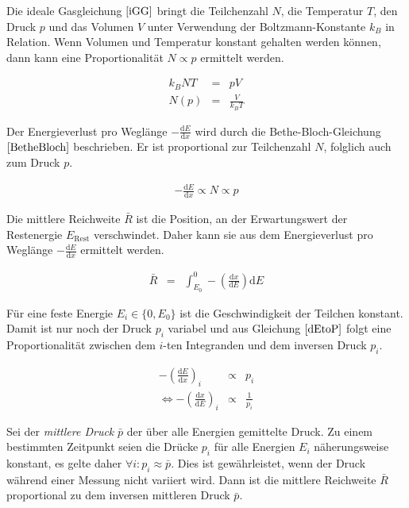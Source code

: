\documentclass[12pt,a4paper]{scrartcl}
\numberwithin{equation}{section} %
\renewcommand{\[}{} %
\renewcommand{\]}{\noindent} %
\begin{document}
Die ideale Gasgleichung \(\eqref{iGG}\) bringt die Teilchenzahl \(N\),
die Temperatur \(T\), den Druck \(p\) und das Volumen \(V\) unter
Verwendung der Boltzmann-Konstante \(k_B\) in Relation. Wenn Volumen und
Temperatur konstant gehalten werden können, dann kann eine
Proportionalität \(N\propto p\) ermittelt werden.

\[
\begin{eqnarray}
    k_B N T &=& pV \label{iGG} \\
    N(p) &=& \frac{V}{k_B T}
\end{eqnarray}
\]

Der Energieverlust pro Weglänge \(-\frac{\mathrm dE}{\mathrm dx}\) wird
durch die Bethe-Bloch-Gleichung \(\eqref{BetheBloch}\) beschrieben. Er
ist proportional zur Teilchenzahl \(N\), folglich auch zum Druck \(p\).

\[
\begin{eqnarray}
    -\frac{\mathrm dE}{\mathrm dx}\propto N\propto p \label{dEtoP}
\end{eqnarray}
\]

Die mittlere Reichweite \(\bar R\) ist die Position, an der
Erwartungswert der Restenergie \(E_\mathrm{Rest}\) verschwindet. Daher
kann sie aus dem Energieverlust pro Weglänge
\(-\frac{\mathrm dE}{\mathrm dx}\) ermittelt werden.

\[
\begin{eqnarray}
    \bar{R} &=&
        \int_{E_0}^{0} -\left(\frac{\mathrm dx}{\mathrm dE}\right) \mathrm dE
\end{eqnarray}
\]

Für eine feste Energie \(E_i \in \{0, E_0\}\) ist die Geschwindigkeit
der Teilchen konstant. Damit ist nur noch der Druck \(p_i\) variabel und
aus Gleichung \(\eqref{dEtoP}\) folgt eine Proportionalität zwischen dem
\(i\)-ten Integranden und dem inversen Druck \(p_i\).

\[
\begin{eqnarray}
    -\left(\frac{\mathrm dE}{\mathrm dx}\right)_i &\propto& p_i \\
    \Leftrightarrow -\left(\frac{\mathrm dx}{\mathrm dE}\right)_i
        &\propto& \frac{1}{p_i}
\end{eqnarray}
\]

Sei der \emph{mittlere Druck} \(\bar p\) der über alle Energien
gemittelte Druck. Zu einem bestimmten Zeitpunkt seien die Drücke \(p_i\)
für alle Energien \(E_i\) näherungsweise konstant, es gelte daher
\(\forall i: p_i \approx \bar p\). Dies ist gewährleistet, wenn der
Druck während einer Messung nicht variiert wird. Dann ist die mittlere
Reichweite \(\bar R\) proportional zu dem inversen mittleren Druck
\(\bar p\).
\end{document}
